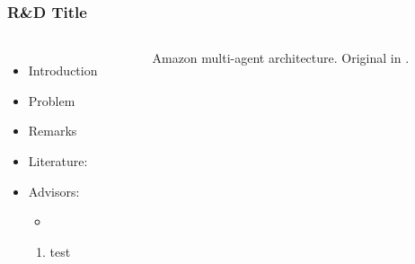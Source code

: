 \documentclass{beamer}
\begin{document}

\begin{frame}
	\frametitle{R\&D Title}

\begin{columns}[c]
\begin{itemize}
	\item Introduction 
	\item Problem
	\item Remarks
	\item Literature:
    
    \item Advisors:
    \begin{itemize}
    \item 
    \end{itemize}
    \begin{enumerate}
    \item test
    \end{enumerate}
\end{itemize}


\begin{figure}
\centering
        \caption{Amazon multi-agent architecture. \tiny{Original in \cite{Wurman2014}}.}
\end{figure}

	
\end{columns}

\end{frame}

\section*{}
\end{document}
